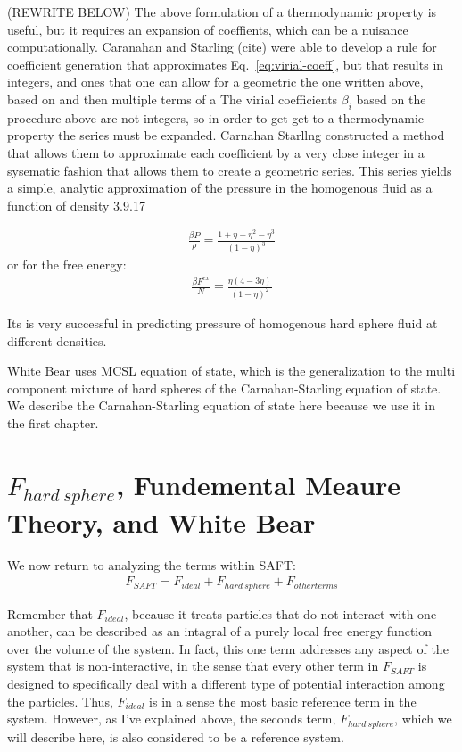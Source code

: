 (REWRITE BELOW)
The above formulation of a thermodynamic property is useful, but it
requires an expansion of coeffients, which can be a nuisance
computationally.  Caranahan and Starling (cite) were able to develop a
rule for coefficient generation that approximates
Eq.~\ref{eq:virial-coeff}, but that results in integers, and ones that
one can allow for a geometric the one written above, based on and then
multiple terms of a The virial coefficients $\beta_i$ based on the
procedure above are not integers, so in order to get get to a
thermodynamic property the series must be expanded.  Carnahan Starllng
constructed a method that allows them to approximate each coefficient
by a very close integer in a sysematic fashion that allows them to
create a geometric series.  This series yields a simple, analytic
approximation of the pressure in the homogenous fluid as a function of
density 3.9.17


\begin{align}
  \frac{\beta P}{\rho}=\frac{1+\eta+\eta^2-\eta^3}{(1-\eta)^3}
\end{align}
or for the free energy:
\begin{align}
  \frac{\beta F^{ex}}{N}=\frac{\eta(4-3\eta)}{(1-\eta)^2}
\end{align}

Its is very successful in predicting pressure of homogenous hard
sphere fluid at different densities.

White Bear uses MCSL equation of state, which is the generalization to
the multi component mixture of hard spheres of the Carnahan-Starling
equation of state.  We describe the Carnahan-Starling equation of
state here because we use it in the first chapter.





\section{$F_{hard~sphere}$, Fundemental Meaure Theory, and White Bear}

We now return to analyzing the terms within SAFT:
\begin{align}
  F_{SAFT} = F_{ideal} + F_{hard~sphere} + F_{other terms}
\end{align}

Remember that $F_{ideal}$, because it treats particles that do not
interact with one another, can be described as an intagral of a purely
local free energy function over the volume of the system.  In fact,
this one term addresses any aspect of the system that is
non-interactive, in the sense that every other term in $F_{SAFT}$ is
designed to specifically deal with a different type of potential
interaction among the particles.  Thus, $F_{ideal}$ is in a sense the
most basic reference term in the system.  However, as I've explained
above, the seconds term, $F_{hard~sphere}$, which we will describe here,
is also considered to be a reference system.

